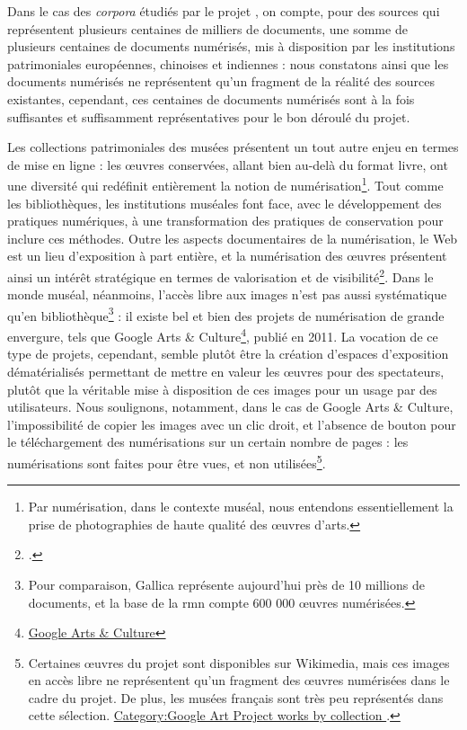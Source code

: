 Dans le cas des \textit{corpora} étudiés par le projet \eida, on compte, pour des sources qui représentent plusieurs centaines de milliers de documents, une somme de plusieurs centaines de documents numérisés, mis à disposition par les institutions patrimoniales européennes, chinoises et indiennes : nous constatons ainsi que les documents numérisés ne représentent qu'un fragment de la réalité des sources existantes, cependant, ces centaines de documents numérisés sont à la fois suffisantes et suffisamment représentatives pour le bon déroulé du projet.

Les collections patrimoniales des musées présentent un tout autre enjeu en termes de mise en ligne : les œuvres conservées, allant bien au-delà du format livre, ont une diversité qui redéfinit entièrement la notion de numérisation\footnote{Par numérisation, dans le contexte muséal, nous entendons essentiellement la prise de photographies de haute qualité des œuvres d'arts.}. Tout comme les bibliothèques, les institutions muséales font face, avec le développement des pratiques numériques, à une transformation des pratiques de conservation pour inclure ces méthodes. Outre les aspects documentaires de la numérisation, le Web est un lieu d'exposition à part entière, et la numérisation des œuvres présentent ainsi un intérêt stratégique en termes de valorisation et de visibilité\footcite{baujardNumerisationPatrimoineCulturel2017}. Dans le monde muséal, néanmoins, l'accès libre aux images n'est pas aussi systématique qu'en bibliothèque\footnote{Pour comparaison, Gallica représente aujourd'hui près de 10 millions de documents, et la base de la \acrfull{rmn} compte 600 000 œuvres numérisées.} : il existe bel et bien des projets de numérisation de grande envergure, tels que Google Arts \& Culture\footnote{\href{https://artsandculture.google.com/}{Google Arts \& Culture}}, publié en 2011. La vocation de ce type de projets, cependant, semble plutôt être la création d'espaces d'exposition dématérialisés permettant de mettre en valeur les œuvres pour des spectateurs, plutôt que la véritable mise à disposition de ces images pour un usage par des utilisateurs. Nous soulignons, notamment, dans le cas de Google Arts \& Culture, l'impossibilité de copier les images avec un clic droit, et l'absence de bouton pour le téléchargement des numérisations sur un certain nombre de pages : les numérisations sont faites pour être vues, et non utilisées\footnote{Certaines œuvres du projet sont disponibles sur Wikimedia, mais ces images en accès libre ne représentent qu'un fragment des œuvres numérisées dans le cadre du projet. De plus, les musées français sont très peu représentés dans cette sélection. \href{https://commons.wikimedia.org/wiki/Category:Google_Art_Project_works_by_collection}{Category:Google Art Project works by collection
}.}. 

